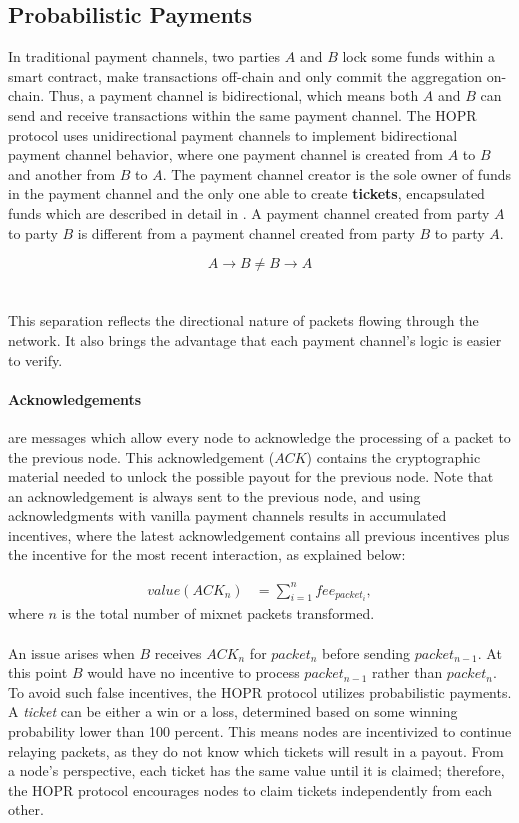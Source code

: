 \subsection{Probabilistic Payments}
\label{sec:probabilisticpayments}

In traditional payment channels, two parties $A$ and $B$ lock some funds within a
smart contract, make transactions off-chain and only commit the aggregation
on-chain. Thus, a payment channel is bidirectional, which means both $A$ and $B$ can
send and receive transactions within the same payment channel. The HOPR protocol uses
unidirectional payment channels to implement bidirectional payment channel behavior, where one
payment channel is created from $A$ to $B$ and another from $B$ to $A$. The payment channel creator is
the sole owner of funds in the payment channel and the only one able to create
\textbf{tickets}, encapsulated funds which are described in detail in
. A payment channel created from party $A$ to party $B$ is
different from a payment channel created from party $B$ to party $A$.

$$A\rightarrow B \neq B\rightarrow A$$
\\~\\This separation reflects the directional nature of packets flowing through the
network. It also brings the advantage that each payment channel's logic is easier to verify.

\paragraph{Acknowledgements} are messages which allow every node to acknowledge
the processing of a packet to the previous node. This acknowledgement ($ACK$) contains
the cryptographic material needed to unlock the possible payout for the previous node.
Note that an acknowledgement is always sent to the previous node, and using
acknowledgments with vanilla payment channels results in accumulated incentives,
where the latest acknowledgement contains all previous incentives plus the
incentive for the most recent interaction, as explained below:

\begin{align}
value (ACK_n) &=\sum_{i=1}^nfee_{packet_i},
\end{align}
where $n$ is the total number of mixnet packets transformed.
\\~\\An issue arises when $B$ receives $ACK_n$ for $packet_n$ before sending
$packet_{n-1}$. At this point $B$ would have no incentive to process
$packet_{n-1}$ rather than $packet_{n}$. To avoid such false incentives, the HOPR
protocol utilizes probabilistic payments. A \textit{ticket} can be either a win
or a loss, determined based on some winning probability lower than 100 percent. This means
nodes are incentivized to continue relaying packets, as they do not know which
tickets will result in a payout. From a node's perspective, each ticket has the same
value until it is claimed; therefore, the HOPR protocol encourages nodes to
claim tickets independently from each other.

